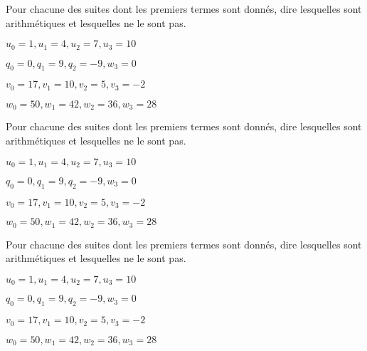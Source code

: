 \documentclass{exos}
\begin{document}
\begin{exercize*}
Pour chacune des suites dont les premiers termes sont donnés, dire lesquelles sont arithmétiques et lesquelles ne le sont pas.
\begin{alphaquestions}
\item $u_0 = 1, u_1 = 4, u_2 = 7, u_3 = 10$
\item $q_0 = 0, q_1 = 9, q_2 = -9, w_3 = 0$
\item $v_0 = 17, v_1 = 10, v_2 = 5, v_3 = -2$
\item $w_0 = 50, w_1 = 42, w_2 = 36, w_3 = 28$
\end{alphaquestions}
\end{exercize*}
\vspace*{3cm}
\begin{exercize*}
Pour chacune des suites dont les premiers termes sont donnés, dire lesquelles sont arithmétiques et lesquelles ne le sont pas.
\begin{alphaquestions}
\item $u_0 = 1, u_1 = 4, u_2 = 7, u_3 = 10$
\item $q_0 = 0, q_1 = 9, q_2 = -9, w_3 = 0$
\item $v_0 = 17, v_1 = 10, v_2 = 5, v_3 = -2$
\item $w_0 = 50, w_1 = 42, w_2 = 36, w_3 = 28$
\end{alphaquestions}
\end{exercize*}
\vspace*{3cm}
\begin{exercize*}
Pour chacune des suites dont les premiers termes sont donnés, dire lesquelles sont arithmétiques et lesquelles ne le sont pas.
\begin{alphaquestions}
\item $u_0 = 1, u_1 = 4, u_2 = 7, u_3 = 10$
\item $q_0 = 0, q_1 = 9, q_2 = -9, w_3 = 0$
\item $v_0 = 17, v_1 = 10, v_2 = 5, v_3 = -2$
\item $w_0 = 50, w_1 = 42, w_2 = 36, w_3 = 28$
\end{alphaquestions}
\end{exercize*}
\end{document}
